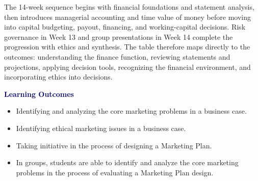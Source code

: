 \begin{visualexplanation}
The 14-week sequence begins with financial foundations and statement analysis, then introduces managerial accounting and time value of money before moving into capital budgeting, payout, financing, and working-capital decisions. Risk governance in Week 13 and group presentations in Week 14 complete the progression with ethics and synthesis. The table therefore maps directly to the outcomes: understanding the finance function, reviewing statements and projections, applying decision tools, recognizing the financial environment, and incorporating ethics into decisions.
\end{visualexplanation}

\begin{minipage}[t]{.66\textwidth}\vspace{0pt}
\textcolor{navy}{\large\bfseries Learning Outcomes}\par
\begin{itemize}
\item Identifying and analyzing the core marketing problems in a business case.
\item Identifying ethical marketing issues in a business case.
\item Taking initiative in the process of designing a Marketing Plan.
\item In groups, students are able to identify and analyze the core marketing problems in the process of evaluating a Marketing Plan design.
\end{itemize}
\end{minipage}\hfill
\begin{minipage}[t]{.32\textwidth}\vspace{0pt}
\end{minipage}
